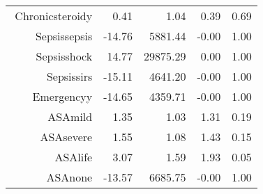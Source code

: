 \begin{tabular}{rrrrr}
$$  Chronic\-steroid\-y & 0.41 & 1.04 & 0.39 & 0.69 \\ 
  Sepsis\-sepsis & -14.76 & 5881.44 & -0.00 & 1.00 \\ 
  Sepsis\-shock & 14.77 & 29875.29 & 0.00 & 1.00 \\ 
  Sepsis\-sirs & -15.11 & 4641.20 & -0.00 & 1.00 \\ 
  Emergency\-y & -14.65 & 4359.71 & -0.00 & 1.00 \\ 
  ASA\-mild & 1.35 & 1.03 & 1.31 & 0.19 \\ 
  ASA\-severe & 1.55 & 1.08 & 1.43 & 0.15 \\ 
  ASA\-life & 3.07 & 1.59 & 1.93 & 0.05 \\ 
  ASA\-none & -13.57 & 6685.75 & -0.00 & 1.00 \\ 
   \hline
\end{tabular}

